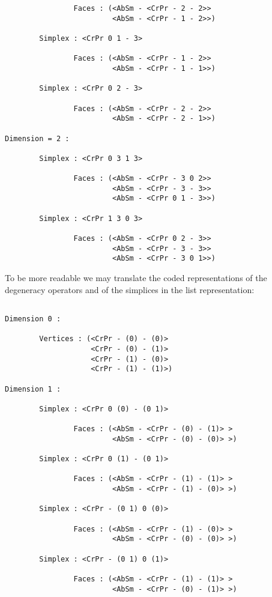 {{\begin{verbatim}
                Faces : (<AbSm - <CrPr - 2 - 2>>
                         <AbSm - <CrPr - 1 - 2>>)

        Simplex : <CrPr 0 1 - 3>

                Faces : (<AbSm - <CrPr - 1 - 2>>
                         <AbSm - <CrPr - 1 - 1>>)

        Simplex : <CrPr 0 2 - 3>

                Faces : (<AbSm - <CrPr - 2 - 2>>
                         <AbSm - <CrPr - 2 - 1>>)

Dimension = 2 :

        Simplex : <CrPr 0 3 1 3>

                Faces : (<AbSm - <CrPr - 3 0 2>>
                         <AbSm - <CrPr - 3 - 3>>
                         <AbSm - <CrPr 0 1 - 3>>)

        Simplex : <CrPr 1 3 0 3>

                Faces : (<AbSm - <CrPr 0 2 - 3>>
                         <AbSm - <CrPr - 3 - 3>>
                         <AbSm - <CrPr - 3 0 1>>)
\end{verbatim}}
To be more readable we may translate the coded representations of the de\-ge\-ne\-ra\-cy operators
and of the simplices in the list representation:
{\footnotesize\begin{verbatim}

Dimension 0 :

        Vertices : (<CrPr - (0) - (0)> 
                    <CrPr - (0) - (1)> 
                    <CrPr - (1) - (0)> 
                    <CrPr - (1) - (1)>)

Dimension 1 :

        Simplex : <CrPr 0 (0) - (0 1)>

                Faces : (<AbSm - <CrPr - (0) - (1)> >
                         <AbSm - <CrPr - (0) - (0)> >)

        Simplex : <CrPr 0 (1) - (0 1)>

                Faces : (<AbSm - <CrPr - (1) - (1)> >
                         <AbSm - <CrPr - (1) - (0)> >)

        Simplex : <CrPr - (0 1) 0 (0)>

                Faces : (<AbSm - <CrPr - (1) - (0)> >
                         <AbSm - <CrPr - (0) - (0)> >)

        Simplex : <CrPr - (0 1) 0 (1)>

                Faces : (<AbSm - <CrPr - (1) - (1)> >
                         <AbSm - <CrPr - (0) - (1)> >)


\end{verbatim}}}
